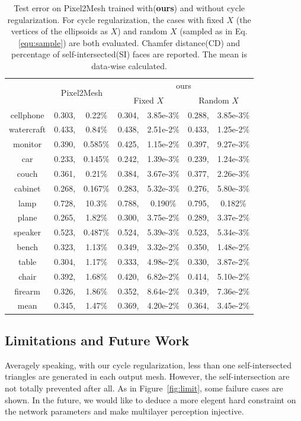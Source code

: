 \begin{table}
	\caption{Test error on Pixel2Mesh trained with(\textbf{ours}) and without cycle regularization. For cycle regularization, the cases with fixed $X$ (the vertices of the ellipsoids as $X$) and random $X$ (sampled as in Eq.\ref{equ:sample}) are both evaluated. Chamfer distance(CD) and percentage of self-intersected(SI) faces are reported. The mean is data-wise calculated.}
	\label{tab:p2m}
	\centering
	\begin{tabular}{c|rc|rc|rc|}
		\diagbox{Category}{CD,SI}{Model}&\multicolumn{2}{c|}{\multirow{2}{*}{Pixel2Mesh}}&\multicolumn{4}{c|}{ours}\\
		\cline{2-7}
		~&~&~&\multicolumn{2}{c|}{Fixed $X$}&\multicolumn{2}{c|}{Random $X$}\\
		\hline
		cellphone&0.303,&0.22\%&0.304,&3.85e-3\%&0.288,&3.85e-3\%\\
		watercraft&0.433,&0.84\%&0.438,&2.51e-2\%&0.433,&1.25e-2\%\\
		monitor&0.390,&0.585\%&0.425,&1.15e-2\%&0.397,&9.27e-3\%\\
		car&0.233,&0.145\%&0.242,&1.39e-3\%&0.239,&1.24e-3\%\\
		couch&0.361,&0.21\%&0.384,&3.67e-3\%&0.377,&2.26e-3\%\\
		cabinet&0.268,&0.167\%&0.283,&5.32e-3\%&0.276,&5.80e-3\%\\
		lamp&0.728,&10.3\%&0.788,&0.190\%&0.795,&0.182\%\\
		plane&0.265,&1.82\%&0.300,&3.75e-2\%&0.289,&3.37e-2\%\\
		speaker&0.523,&0.487\%&0.524,&5.39e-3\%&0.523,&5.34e-3\%\\
		bench&0.323,&1.13\%&0.349,&3.32e-2\%&0.350,&1.48e-2\%\\
		table&0.304,&1.17\%&0.333,&4.98e-2\%&0.330,&3.87e-2\%\\
		chair&0.392,&1.68\%&0.420,&6.82e-2\%&0.414,&5.10e-2\%\\
		firearm&0.326,&1.86\%&0.352,&8.64e-2\%&0.349,&7.36e-2\%\\
		\hline
		mean &0.345,&1.47\%&0.369,& 4.20e-2\%&0.364,& 3.45e-2\%\\
	\end{tabular}
\end{table}

\subsection{Limitations and Future Work}
Averagely speaking, with our cycle regularization, less than one self-intersected triangles are generated in each output mesh. However, the self-intersection are not totally prevented after all. As in Figure~\ref{fig:limit}, some failure cases are shown. In the future,  we would like to deduce a more elegent hard constraint on the network parameters and make multilayer perception injective. 

